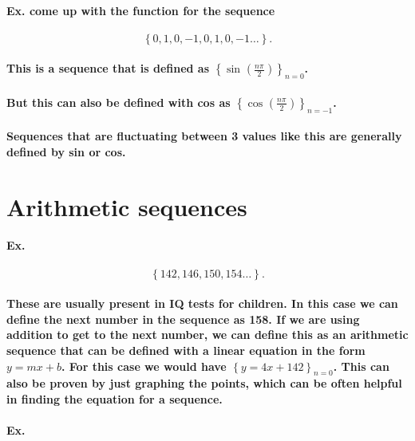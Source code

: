\paragraph{Ex. come up with the function for the sequence}

\[
	\left\{0,1,0,-1,0,1,0,-1 \ldots \right\}
.\]

\paragraph{This is a sequence that is defined as $\left\{\sin^{}( \frac{n\pi^{}}{2} )\right\}_{n=0}$. }

\paragraph{But this can also be defined with cos as $\left\{\cos^{}( \frac{n\pi^{}}{2} )\right\}_{n=-1}$.}
\paragraph{Sequences that are fluctuating between 3 values like this are generally defined by sin or cos.}



\section{Arithmetic sequences}%
\label{sec:Arithmetic sequences}

\paragraph{Ex.}
\[
	\left\{ 142,146,150,154 \ldots\right\}
.\] 
\paragraph{These are usually present in IQ tests for children. In this case we can define the next number in the sequence as 158. If we are using addition to get to the next number, we can define this as an arithmetic sequence that can be defined with a linear equation in the form $y=mx+b$. For this case we would have $\left\{y=4x+142\right\}_{n=0}$. This can also be proven by just graphing the points, which can be often helpful in finding the equation for a sequence.}

\paragraph{Ex.}

